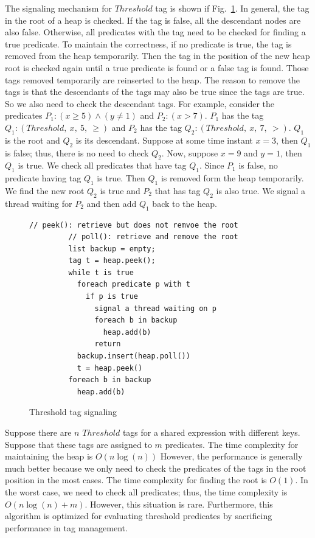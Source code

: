 \documentclass[preprint]{sigplanconf}
\begin{document}
The signaling mechanism for $Threshold$ tag is shown if Fig.~\ref{fig:th_sig}. In
general, the tag in the root of a heap is checked. If the tag is false, all the
descendant nodes are also false. Otherwise, all predicates with the tag
need to be checked for finding a true predicate. To maintain the correctness, 
if no predicate is true, the tag is removed from the heap temporarily. Then the
tag in the position of the new heap root is checked again until a true predicate is found or a
false tag is found. Those tags removed temporarily are reinserted to the heap.
The reason to remove the tags is that the descendants of the tags may also be
true since the tags are true. So we also need to check the descendant tags. For
example, consider the predicates $P_1: (x \ge 5) \wedge (y \ne 1)$ and 
$P_2: (x > 7)$. $P_1$ has the tag $Q_1: (Threshold,\ x,\ 5,\ \ge)$ and $P_2$
has the tag $Q_2: (Threshold,\ x,\ 7,\ >)$. $Q_1$ is the root and $Q_2$ is its
descendant. Suppose at some time instant $x=3$, then $Q_1$ is false; thus, there is no
need to check $Q_2$. Now, suppose $x = 9$ and $y = 1$, then $Q_1$ is true. We
check all predicates that have tag $Q_1$.  Since $P_1$ is false, no predicate
having tag $Q_1$ is true. Then $Q_1$ is removed form the heap temporarily. We find the
new root $Q_2$ is true and $P_2$ that has tag $Q_2$ is also true. We signal 
a thread waiting for $P_2$ and then add $Q_1$ back to the heap. 

\begin{figure}[ht!]
    \begin{Verbatim}[fontsize=\footnotesize,gobble=8,frame=lines,
            framesep=3mm]
         // peek(): retrieve but does not remvoe the root 
         // poll(): retrieve and remove the root 
         list backup = empty;
         tag t = heap.peek();
         while t is true
           foreach predicate p with t
             if p is true
               signal a thread waiting on p
               foreach b in backup 
                 heap.add(b)
               return 
           backup.insert(heap.poll())
           t = heap.peek()
         foreach b in backup 
           heap.add(b)
    \end{Verbatim}
  \caption{Threshold tag signaling}
  \label{fig:th_sig}
\end{figure}


Suppose there are $n$ $Threshold$ tags for a shared expression with different 
keys. Suppose that these tags are assigned to $m$ predicates. The time 
complexity for maintaining the heap is $O(n \log(n))$ 
However, the performance is generally much better because we only
need to check the predicates of the tags in the root position in the most
cases. The time complexity for finding the root is $O(1)$. In the worst case, 
we need to check all predicates; thus, the time complexity is $O(n \log(n) + m)$. 
However, this situation is rare. Furthermore, this algorithm is optimized for
evaluating threshold predicates by sacrificing performance in tag management.  
\end{document}
